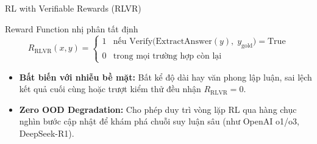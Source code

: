 \begin{frame}{RL with Verifiable Rewards (RLVR)}
  \begin{block}{Reward Function nhị phân tất định}
    \[
      R_{\text{RLVR}}(x, y) = \begin{cases}
        1 & \text{nếu } \mathrm{Verify}\big(\mathrm{ExtractAnswer}(y),\; y_{\text{gold}}\big) = \mathrm{True} \\
        0 & \text{trong mọi trường hợp còn lại}
      \end{cases}
    \]
  \end{block}

  \small
  \begin{itemize}\setlength{\itemsep}{4pt}
    \item \textbf{Bất biến với nhiễu bề mặt:} Bất kể độ dài hay văn phong lập luận, sai lệch kết quả cuối cùng hoặc trượt kiểm thử đều nhận $R_{\text{RLVR}} = 0$.
    \item \textbf{Zero OOD Degradation:} Cho phép duy trì vòng lặp RL qua hàng chục nghìn bước cập nhật để khám phá chuỗi suy luận sâu (như OpenAI o1/o3, DeepSeek-R1).
  \end{itemize}
  \par\vspace{0pt}
\end{frame}

